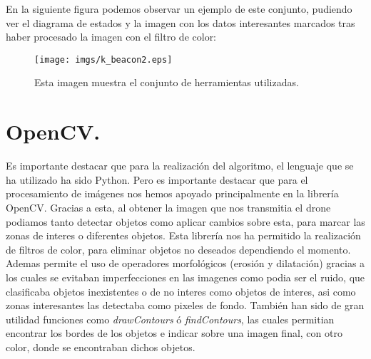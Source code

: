 En la siguiente figura podemos observar un ejemplo de este conjunto, pudiendo ver el diagrama de estados y la imagen con los datos interesantes marcados tras haber procesado la imagen con el filtro de color:

\begin{figure}[ht]
	\centering
		\texttt{[image: imgs/k\_beacon2.eps]}
		\caption{Esta imagen muestra el conjunto de herramientas utilizadas.}
	\label{fig:Herramientas}
\end{figure}

\section{OpenCV.}
\hspace{1 cm}  Es importante destacar que para la realizaci\'on del algoritmo, el lenguaje que se ha utilizado ha sido Python. Pero es importante destacar que para el procesamiento de im\'agenes nos hemos apoyado principalmente en la librer\'ia OpenCV. Gracias a esta, al obtener la imagen que nos transmitia el drone podiamos tanto detectar objetos como aplicar cambios sobre esta, para marcar las zonas de interes o diferentes objetos.
\hspace{1 cm} Esta librer\'ia nos ha permitido la realizaci\'on de filtros de color, para eliminar objetos no deseados dependiendo el momento. Ademas permite el uso de operadores morfol\'ogicos (erosi\'on y dilataci\'on) gracias a los cuales se evitaban imperfecciones en las imagenes como podia ser el ruido, que clasificaba objetos inexistentes o de no interes como objetos de interes, asi como zonas interesantes las detectaba como pixeles de fondo. Tambi\'en han sido de gran utilidad funciones como \textit{drawContours} \'o \textit{findContours}, las cuales permitian encontrar los bordes de los objetos e indicar sobre una imagen final, con otro color, donde se encontraban dichos objetos. 
